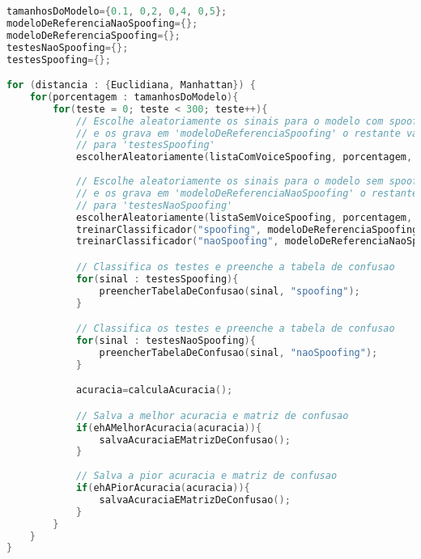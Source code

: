 \begin{lstlisting}[language=C++, caption={Algoritmo que caracteriza o procedimento 02}, label={lst:experiment02Algo}]
tamanhosDoModelo={0.1, 0,2, 0,4, 0,5};
modeloDeReferenciaNaoSpoofing={};
modeloDeReferenciaSpoofing={};
testesNaoSpoofing={};
testesSpoofing={};

for (distancia : {Euclidiana, Manhattan}) {
	for(porcentagem : tamanhosDoModelo){
		for(teste = 0; teste < 300; teste++){
			// Escolhe aleatoriamente os sinais para o modelo com spoofing 
			// e os grava em 'modeloDeReferenciaSpoofing' o restante vai 
			// para 'testesSpoofing'
			escolherAleatoriamente(listaComVoiceSpoofing, porcentagem, modeloDeReferenciaSpoofing, testesSpoofing);
			
			// Escolhe aleatoriamente os sinais para o modelo sem spoofing
			// e os grava em 'modeloDeReferenciaNaoSpoofing' o restante vai 
			// para 'testesNaoSpoofing'
			escolherAleatoriamente(listaSemVoiceSpoofing, porcentagem, modeloDeReferenciaNaoSpoofing, testesNaoSpoofing);
			treinarClassificador("spoofing", modeloDeReferenciaSpoofing);
			treinarClassificador("naoSpoofing", modeloDeReferenciaNaoSpoofing);

			// Classifica os testes e preenche a tabela de confusao
			for(sinal : testesSpoofing){
				preencherTabelaDeConfusao(sinal, "spoofing");
			} 

			// Classifica os testes e preenche a tabela de confusao
			for(sinal : testesNaoSpoofing){
				preencherTabelaDeConfusao(sinal, "naoSpoofing");
			}

			acuracia=calculaAcuracia();

			// Salva a melhor acuracia e matriz de confusao
			if(ehAMelhorAcuracia(acuracia)){
				salvaAcuraciaEMatrizDeConfusao();
			}
			
			// Salva a pior acuracia e matriz de confusao
			if(ehAPiorAcuracia(acuracia)){
				salvaAcuraciaEMatrizDeConfusao();
			}
		}
	}
}				
\end{lstlisting}
